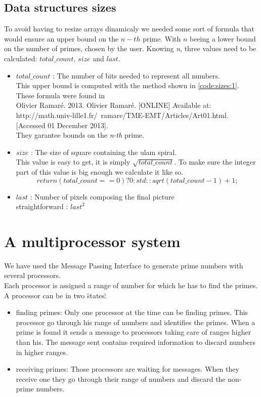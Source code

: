 \documentclass[a4paper,12pt]{article}
\begin{document}
\subsection{Data structures sizes}
To avoid having to resize arrays dinamicaly we needed some sort of formula that would ensure an upper bound on the $n-th$ prime. With $n$ beeing a lower bound on the number of primes, chosen by the user. Knowing \textit{n}, three values need to be calculated: $total\_count$, $size$ and $last$.
\begin{itemize}
	\item{$total\_count$} 
	: The number of bits needed to represent all numbers.\\ This upper bound is computed with the method shown in \ref{code:sizes:1}.\\ These formula were found in \\Olivier Ramaré. 2013. Olivier Ramaré. [ONLINE] Available at: http://math.univ-lille1.fr/~ramare/TME-EMT/Articles/Art01.html. [Accessed 01 December 2013]. \\They garantee bounds on the \textit{n-th} prime.
	\item{$size$} 
	: The size of square containing the ulam spiral.\\
	This value is easy to get, it is simply $\sqrt{total\_count}$. To make sure the integer part of this value is big enough we calculate it like so.
	$$return (total\_count == 0) ? 0 : std::sqrt(total\_count - 1) + 1;$$

	\item{$last$}
	: Number of pixels composing the final picture\\
	straightforward : ${last}^{2}$
	
	
\end{itemize}



\newpage\cleardoublepage{}
\section{A multiprocessor system}


We have used the Message Passing Interface to generate prime numbers with several processors. \\ Each processor is assigned a range of number for which he has to find the primes. A processor can be in two \"states\":
\begin{itemize}
	\item{finding primes: }
	Only one processor at the time can be finding primes. This processor go through his range of numbers and identifies the primes. When a prime is found it sends a message to processors taking care of ranges higher than his. The message sent contains required information to discard numbers in higher ranges. 
	\item{receiving primes: }
	Those processors are waiting for messages. When they receive one they go through their range of numbers and discard the non-prime numbers. 

\end{itemize}
\end{document}
